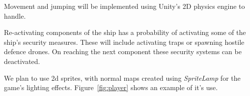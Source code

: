 Movement and jumping will be implemented using Unity's 2D physics engine to handle.

Re-activating components of the ship has a probability of activating some of the ship's security measures. These will include activating traps or spawning hostile defence drones. On reaching the next component these security systems can be deactivated.

We plan to use 2d sprites, with normal maps created using \textit{SpriteLamp} for the game's lighting effects. Figure~\ref{fig:player} shows an example of it's use.